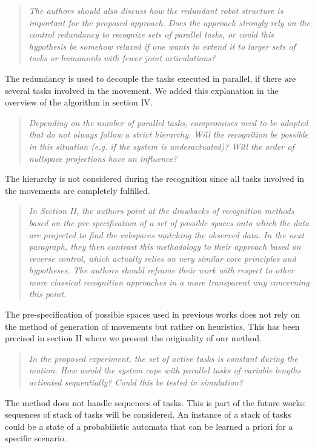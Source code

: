 \documentclass[11pt]{article}
\begin{document}
\begin{quote}
\textit{
The authors should also discuss how the redundant robot structure is important for the proposed approach. Does the approach strongly rely on the control redundancy to recognize sets of parallel tasks, or could this hypothesis be somehow relaxed if one wants to extend it to larger sets of tasks or humanoids with fewer joint articulations?
}
\end{quote}
The redundancy is used to decouple the tasks executed in parallel, if there are several tasks involved in the movement.
We added this explanation in the overview of the algorithm in section IV.

\begin{quote}
\textit{
Depending on the number of parallel tasks, compromises need to be adopted that do not always follow a strict hierarchy. Will the recognition be possible in this situation (e.g. if the system is underactuated)? Will the order of nullspace projections have an influence?
}
\end{quote}
The hierarchy is not considered during the recognition since all tasks involved in the movements are completely fulfilled.

\begin{quote}
\textit{
In Section II, the authors point at the drawbacks of recognition methods based on the pre-specification of a set of possible spaces onto which the data are projected to find the subspaces matching the observed data. In the next paragraph, they then contrast this methodology to their approach based on reverse control, which actually relies on very similar core principles and hypotheses. The authors should reframe their work with respect to other more classical recognition approaches in a more transparent way concerning this point.
}
\end{quote}
The pre-specification of possible spaces used in previous works does not rely
on the method of generation of movements but rather on heuristics.
This has been precised in section II where we present the originality of our method.

\begin{quote}
\textit{
In the proposed experiment, the set of active tasks is constant during the motion. How would the system cope with parallel tasks of variable lengths activated sequentially? Could this be tested in simulation?
}
\end{quote}
The method does not handle sequences of tasks. This is part of the future works:
sequences of stack of tasks will be considered. An instance of a stack
of tasks could be a state of a probabilistic automata that can be learned a priori for
a specific scenario. 
\end{document}

